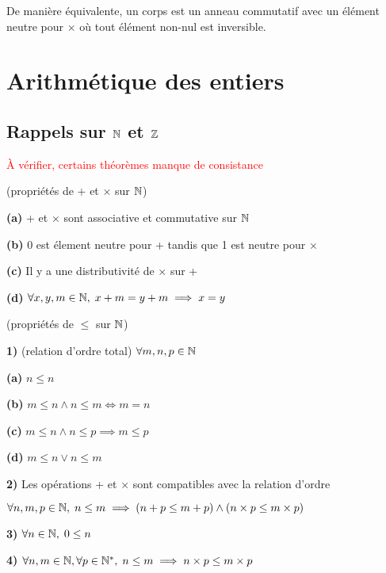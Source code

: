 \documentclass[a4paper, 12pt]{article}
\begin{document}
\begin{remark}
    De manière équivalente, un corps est un anneau commutatif avec un élément neutre pour $\times$ où tout élément non-nul est inversible.
\end{remark}

\section{Arithmétique des entiers}

\subsection{Rappels sur $\mathbb{N}$ et $\mathbb{Z}$}

\textcolor{red}{À vérifier, certains théorèmes manque de consistance}

\begin{theorem}
    (propriétés de + et $\times$ sur $\mathbb{N}$)
    \item \textbf{(a)} + et $\times$ sont associative et commutative sur $\mathbb{N}$

    \item \textbf{(b)} 0 est élement neutre pour + tandis que 1 est neutre pour $\times$

    \item \textbf{(c)} Il y a une distributivité de $\times$ sur +

    \item \textbf{(d)} $\forall x, y, m \in \mathbb{N}, \; x + m = y + m \implies x = y$
\end{theorem}

\begin{theorem}
    (propriétés de $\leq$ sur $\mathbb{N}$)

    \item \textbf{1)} (relation d'ordre total) $\forall m, n, p \in \mathbb{N}$
    
    \item \textbf{(a)} $n \leq n$
    \item \textbf{(b)} $m \leq n \land n \leq m \iff m = n$
    \item \textbf{(c)} $m \leq n \land n \leq p \implies m \leq p$
    \item \textbf{(d)} $m \leq n \lor n \leq m$
    
    \item \textbf{2)} Les opérations + et $\times$ sont compatibles avec la relation d'ordre

        $\forall n, m, p \in \mathbb{N}, \; n \leq m \implies (n + p \leq m + p) \land (n \times p \leq m \times p)$

    \item \textbf{3)} $\forall n \in \mathbb{N}, \; 0 \leq n$
    \item \textbf{4)} $\forall n, m \in \mathbb{N}, \forall p \in \mathbb{N}^*, \; n \leq m \implies n \times p \leq m \times p$
\end{theorem}
\end{document}
